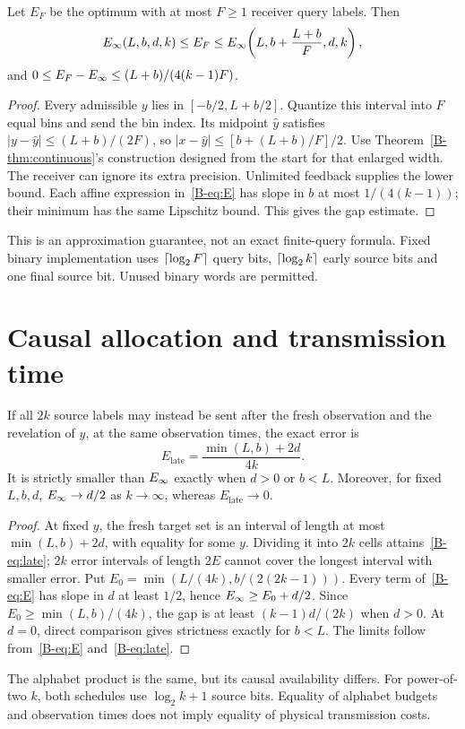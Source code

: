 \begin{proposition}\label{B-prop:finitequery}
Let $E_F$ be the optimum with at most $F\geq1$ receiver query labels. Then
\begin{equation}\label{B-eq:finitequery}
E_{\infty}(L,b,d,k)\leq E_F\leq E_{\infty}\!\left(L,b+\frac{L+b}{F},d,k\right),
\end{equation}
and $0\leq E_F-E_{\infty}\leq(L+b)/(4(k-1)F)$.
\end{proposition}
\begin{proof}
Every admissible $y$ lies in $[-b/2,L+b/2]$. Quantize this interval into $F$ equal bins and send the bin index. Its midpoint $\widehat y$ satisfies $|y-\widehat y|\leq(L+b)/(2F)$, so $|x-\widehat y|\leq[b+(L+b)/F]/2$. Use Theorem~\ref{B-thm:continuous}'s construction designed from the start for that enlarged width. The receiver can ignore its extra precision. Unlimited feedback supplies the lower bound. Each affine expression in~\eqref{B-eq:E} has slope in $b$ at most $1/(4(k-1))$; their minimum has the same Lipschitz bound. This gives the gap estimate.
\end{proof}
This is an approximation guarantee, not an exact finite-query formula. Fixed binary implementation uses $\left\lceil \log_2F\right\rceil$ query bits, $\left\lceil \log_2k\right\rceil$ early source bits and one final source bit. Unused binary words are permitted.

\section{Causal allocation and transmission time}
\begin{corollary}\label{B-cor:late}
If all $2k$ source labels may instead be sent after the fresh observation and the revelation of $y$, at the same observation times, the exact error is
\begin{equation}\label{B-eq:late}
E_{\mathrm{late}}=\frac{\min(L,b)+2d}{4k}.
\end{equation}
It is strictly smaller than $E_{\infty}$ exactly when $d>0$ or $b<L$. Moreover, for fixed $L,b,d$, $E_{\infty}\to d/2$ as $k\to\infty$, whereas $E_{\mathrm{late}}\to0$.
\end{corollary}
\begin{proof}
At fixed $y$, the fresh target set is an interval of length at most $\min(L,b)+2d$, with equality for some $y$. Dividing it into $2k$ cells attains~\eqref{B-eq:late}; $2k$ error intervals of length $2E$ cannot cover the longest interval with smaller error. Put $E_0=\min(L/(4k),b/(2(2k-1)))$. Every term of~\eqref{B-eq:E} has slope in $d$ at least $1/2$, hence $E_{\infty}\geq E_0+d/2$. Since $E_0\geq\min(L,b)/(4k)$, the gap is at least $(k-1)d/(2k)$ when $d>0$. At $d=0$, direct comparison gives strictness exactly for $b<L$. The limits follow from~\eqref{B-eq:E} and~\eqref{B-eq:late}.
\end{proof}
The alphabet product is the same, but its causal availability differs. For power-of-two $k$, both schedules use $\log_2k+1$ source bits. Equality of alphabet budgets and observation times does not imply equality of physical transmission costs.


